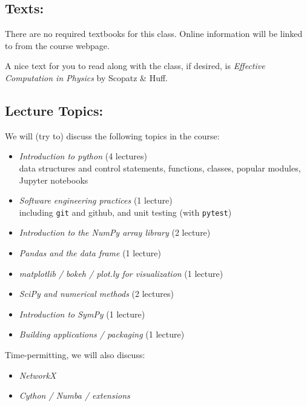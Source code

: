 \documentclass[11pt]{article}
\newenvironment{itemsquish}
  { \begin{itemize}
    \addtolength{\itemsep}{-0.25\baselineskip}
    \addtolength{\baselineskip}{-0.25\baselineskip} }
  { \end{itemize} }
\begin{document}
\subsection*{Texts:}

There are no required textbooks for this class.  Online information
will be linked to from the course webpage.

A nice text for you to read along with the class, if desired, is
{\em Effective Computation in Physics}\/ by Scopatz \& Huff.



\subsection*{Lecture Topics:}

We will (try to) discuss the following topics in the course:
%
\begin{itemsquish}
\item {\em Introduction to python} (4 lectures) \\ data structures and
  control statements, functions, classes, popular modules, Jupyter
  notebooks

\item {\em Software engineering practices} (1 lecture) \\
  including {\tt git} and github, and unit testing (with {\tt pytest})

\item {\em Introduction to the NumPy array library} (2 lecture)

\item {\em Pandas and the data frame} (1 lecture)

\item {\em matplotlib / bokeh / plot.ly for visualization} (1 lecture)

\item {\em SciPy and numerical methods} (2 lectures)

\item {\em Introduction to SymPy} (1 lecture)

\item {\em Building applications / packaging} (1 lecture)
\end{itemsquish}

\noindent Time-permitting, we will also discuss:
\begin{itemsquish}
\item {\em NetworkX}

\item {\em Cython / Numba / extensions}

\end{itemsquish}
\end{document}
